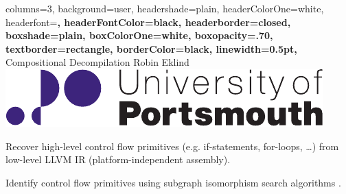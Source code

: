 \documentclass[a2paper,landscape,fontscale=0.35]{baposter}
\begin{document}
\begin{poster}{
	columns=3,
	background=user,
	headershade=plain,
	headerColorOne=white,
	headerfont=\Large\bfseries,
	headerFontColor=black,
	headerborder=closed,
	boxshade=plain,
	boxColorOne=white,
	boxopacity=.70,
	textborder=rectangle,
	borderColor=black,
	linewidth=0.5pt,
}
{}
{Compositional Decompilation}
{Robin Eklind}
{\includegraphics[height=0.05\textheight]{inc/logo.pdf}}

{
	Recover high-level control flow primitives (e.g. if-statements, for-loops, …) from low-level LLVM IR (platform-independent assembly).
}

{
	Identify control flow primitives using subgraph isomorphism search algorithms \cite{decomp_of_llvm}.

	\setlength{\intextsep}{5pt}
	\setlength{\abovecaptionskip}{5pt}

}
\end{poster}
\end{document}

